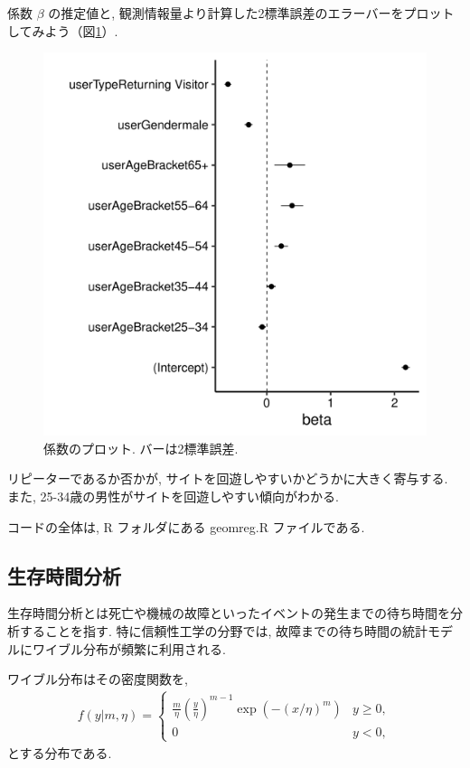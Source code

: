\documentclass[a4paper, 12pt]{jarticle}
\begin{document}
係数 $\beta$ の推定値と, 観測情報量より計算した2標準誤差のエラーバーをプロットしてみよう（図\ref{coefgeomreg}）. 

\begin{figure}
\includegraphics[width=13cm,clip]{./img/coefgeomreg.pdf}
\caption{係数のプロット. バーは2標準誤差.}
\label{coefgeomreg}
\end{figure}

リピーターであるか否かが, サイトを回遊しやすいかどうかに大きく寄与する. 
また, 25-34歳の男性がサイトを回遊しやすい傾向がわかる. 

コードの全体は, R フォルダにある geomreg.R ファイルである. 

\subsection{生存時間分析}

生存時間分析とは死亡や機械の故障といったイベントの発生までの待ち時間を分析することを指す.
特に信頼性工学の分野では, 故障までの待ち時間の統計モデルにワイブル分布が頻繁に利用される.

ワイブル分布はその密度関数を,
\begin{align}
f(y|m,\eta) =
\begin{cases}
\frac{m}{\eta}\left(\frac{y}{\eta}\right)^{m-1}\exp(-(x/\eta)^{m}) & y\geq 0 ,\\
0 & y<0,
\end{cases}
\end{align}
とする分布である.
\end{document}
